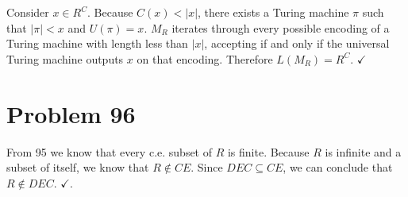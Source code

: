 \documentclass[11pt]{article}
\begin{document}
Consider $x \in R^C$.
Because $C(x) < |x|$, there exists a Turing machine $\pi$ such that $|\pi| < x$ and $U(\pi) = x$.
$M_R$ iterates through every possible encoding of a Turing machine with length less than $|x|$, accepting if and only if the universal Turing machine outputs $x$ on that encoding.
Therefore $L(M_R) = R^C$. $\checkmark$



\section*{Problem 96}

From 95 we know that every c.e. subset of $R$ is finite.
Because $R$ is infinite and a subset of itself, we know that $R \notin CE$.
Since $DEC \subseteq CE$, we can conclude that $R \notin DEC$. $\checkmark$.
\end{document}
